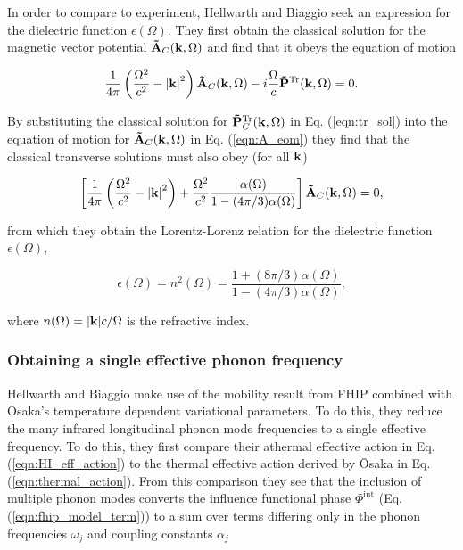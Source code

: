 In order to compare to experiment, Hellwarth and Biaggio seek an expression for the dielectric  function $\epsilon(\Omega)$. They first obtain the classical solution for the magnetic vector potential $\vb{\Tilde{A}}_C(\vb{k}, \Omega)$ and find that it obeys the equation of motion 

\begin{equation}\label{eqn:A_eom}
    \frac{1}{4\pi} \left( \frac{\Omega^2}{c^2} - \abs{\vb{k}}^2 \right) \vb{\Tilde{A}}_C(\vb{k}, \Omega) - i \frac{\Omega}{c} \vb{\Tilde{P}}^{\text{Tr}}(\vb{k}, \Omega) = 0.
\end{equation}

By substituting the classical solution for $\vb{\Tilde{P}}^{\text{Tr}}_{C}(\vb{k}, \Omega)$ in Eq. (\ref{eqn:tr_sol}) into the equation of motion for $\vb{\Tilde{A}}_C(\vb{k}, \Omega)$ in Eq. (\ref{eqn:A_eom}) they find that the classical transverse solutions must also obey (for all $\vb{k}$)

\begin{equation}
    \left[ \frac{1}{4\pi} \left( \frac{\Omega^2}{c^2} - \abs{\vb{k}}^2 \right) + \frac{\Omega^2}{c^2} \frac{\alpha(\Omega)}{1 - (4\pi / 3) \alpha(\Omega)} \right] \vb{\Tilde{A}}_C(\vb{k}, \Omega) = 0,
\end{equation}

from which they obtain the Lorentz-Lorenz relation for the dielectric function $\epsilon(\Omega)$,

\begin{equation}
    \epsilon(\Omega) = n^2(\Omega) = \frac{1 + (8\pi/3)\alpha(\Omega)}{1 - (4\pi/3)\alpha(\Omega)},
\end{equation}

where $n(\Omega) = \abs{\vb{k}} c / \Omega$ is the refractive index.

\subsubsection{Obtaining a single effective phonon frequency}
\label{subsubsec:2-3-3-5}

Hellwarth and Biaggio make use of the mobility result from FHIP combined with \=Osaka's temperature dependent variational parameters. To do this, they reduce the many infrared longitudinal phonon mode frequencies to a single effective frequency. To do this, they first compare their athermal effective action in Eq. (\ref{eqn:HI_eff_action}) to the thermal effective action derived by \=Osaka in Eq. (\ref{eqn:thermal_action}). From this comparison they see that the inclusion of multiple phonon modes converts the influence functional phase $\Phi^{\text{int}}$ (Eq. (\ref{eqn:fhip_model_term})) to a sum over terms differing only in the phonon frequencies $\omega_j$ and coupling constants $\alpha_j$

